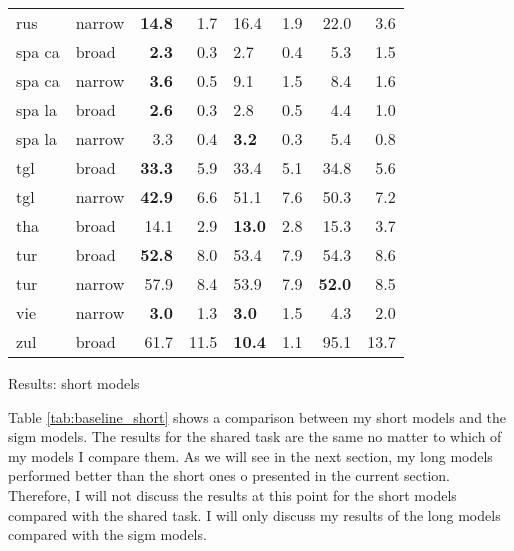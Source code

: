 {\begin{tabularx}{\textwidth}{|l|X||r|r||X|X||r|r|}
rus    & narrow & \textbf{14.8} & 1.7  & 16.4 & 1.9  & 22.0 & 3.6  \\
spa ca & broad  & \textbf{2.3}  & 0.3  & 2.7  & 0.4  & 5.3  & 1.5  \\
spa ca & narrow & \textbf{3.6}  & 0.5  & 9.1  & 1.5  & 8.4  & 1.6  \\
spa la & broad  & \textbf{2.6}  & 0.3  & 2.8  & 0.5  & 4.4  & 1.0  \\
spa la & narrow & 3.3  & 0.4  & \textbf{3.2}  & 0.3  & 5.4  & 0.8  \\
tgl    & broad  & \textbf{33.3} & 5.9  & 33.4 & 5.1  & 34.8 & 5.6  \\
tgl    & narrow & \textbf{42.9} & 6.6  & 51.1 & 7.6  & 50.3 & 7.2  \\
tha    & broad  & 14.1 & 2.9  & \textbf{13.0} & 2.8  & 15.3 & 3.7  \\
tur    & broad  & \textbf{52.8} & 8.0  & 53.4 & 7.9  & 54.3 & 8.6  \\
tur    & narrow & 57.9 & 8.4  & 53.9 & 7.9  & \textbf{52.0} & 8.5  \\
vie    & narrow & \textbf{3.0}  & 1.3  & \textbf{3.0}  & 1.5  & 4.3  & 2.0  \\
zul    & broad  & 61.7 & 11.5 & \textbf{10.4} & 1.1  & 95.1 & 13.7 \\ \hline
\end{tabularx}
}{Results: short models}

Table \ref{tab:baseline_short} shows a comparison between my short models and the \ac{sigm} models. The results for the shared task are the same no matter to which of my models I compare them. As we will see in the next section, my long models performed better than the short ones o presented in the current section. Therefore, I will not discuss the results at this point for the short models compared with the shared task. I will only discuss my results of the long models compared with the \ac{sigm} models.


